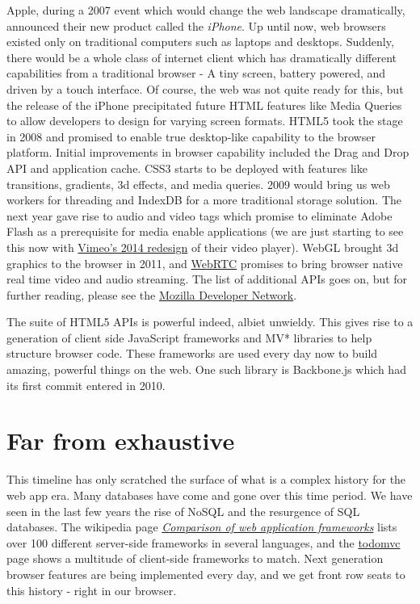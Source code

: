 \documentclass[12pt,letterpaper,fleqn]{article}
\newcommand{\jurl}[2]{\textcolor{myblue}{\href{#2}{#1}}}
\begin{document}
Apple, during a 2007 event which would change the web landscape dramatically, announced their new product called the \textit{iPhone}. Up until now, web browsers existed only on traditional computers such as laptops and desktops. Suddenly, there would be a whole class of internet client which has dramatically different capabilities from a traditional browser - A tiny screen, battery powered, and driven by a touch interface. Of course, the web was not quite ready for this, but the release of the iPhone precipitated future HTML features like Media Queries to allow developers to design for varying screen formats.
\clearpage
HTML5 took the stage in 2008 and promised to enable true desktop-like capability to the browser platform. Initial improvements in browser capability included the Drag and Drop API and application cache. CSS3 starts to be deployed with features like transitions, gradients, 3d effects, and media queries. 2009 would bring us web workers for threading and IndexDB for a more traditional storage solution. The next year gave rise to audio and video tags which promise to eliminate Adobe Flash as a prerequisite for media enable applications (we are just starting to see this now with \jurl{Vimeo's 2014 redesign}{http://techcrunch.com/2014/01/07/vimeo-new-video-player/} of their video player). WebGL brought 3d graphics to the browser in 2011, and \jurl{WebRTC}{http://www.webrtc.org/home} promises to bring browser native real time video and audio streaming. The list of additional APIs goes on, but for further reading, please see the \jurl{Mozilla Developer Network}{https://developer.mozilla.org/en-US/}.

The suite of HTML5 APIs is powerful indeed, albiet unwieldy. This gives rise to a generation of client side JavaScript frameworks and MV* libraries to help structure browser code. These frameworks are used every day now to build amazing, powerful things on the web. One such library is Backbone.js which had its first commit entered in 2010.

\section*{Far from exhaustive}

This timeline has only scratched the surface of what is a complex history for the web app era. Many databases have come and gone over this time period. We have seen in the last few years the rise of NoSQL and the resurgence of SQL databases. The wikipedia page \jurl{\textit{Comparison of web application frameworks}}{http://en.wikipedia.org/wiki/Comparison_of_web_application_frameworks} lists over 100 different server-side frameworks in several languages, and the \jurl{todomvc}{http://todomvc.com/} page shows a multitude of client-side frameworks to match. Next generation browser features are being implemented every day, and we get front row seats to this history - right in our browser.

% 
% 
\end{document}
